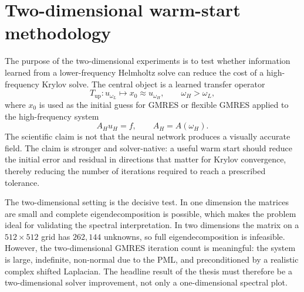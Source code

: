 %
%

\section{Two-dimensional warm-start methodology}
\label{sec:methodology_2d_warm_start}

The purpose of the two-dimensional experiments is to test whether information
learned from a lower-frequency Helmholtz solve can reduce the cost of a
high-frequency Krylov solve. The central object is a learned transfer operator
\begin{equation}
    T_{\mathrm{up}}:
    u_{\omega_L} \mapsto x_0 \approx u_{\omega_H},
    \qquad \omega_H > \omega_L,
    \label{eq:twod_transfer_operator}
\end{equation}
where $x_0$ is used as the initial guess for GMRES or flexible GMRES applied
to the high-frequency system
\begin{equation}
    A_H u_H = f,
    \qquad A_H = A(\omega_H).
    \label{eq:twod_high_frequency_system}
\end{equation}
The scientific claim is not that the neural network produces a visually
accurate field. The claim is stronger and solver-native: a useful warm start
should reduce the initial error and residual in directions that matter for
Krylov convergence, thereby reducing the number of iterations required to
reach a prescribed tolerance.

The two-dimensional setting is the decisive test. In one dimension the
matrices are small and complete eigendecomposition is possible, which makes
the problem ideal for validating the spectral interpretation. In two
dimensions the matrix on a $512 \times 512$ grid has $262{,}144$ unknowns, so
full eigendecomposition is infeasible. However, the two-dimensional GMRES
iteration count is meaningful: the system is large, indefinite, non-normal due
to the PML, and preconditioned by a realistic complex shifted Laplacian. The
headline result of the thesis must therefore be a two-dimensional solver
improvement, not only a one-dimensional spectral plot.


